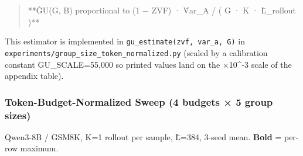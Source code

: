 \documentclass[
  american,
  11pt,
  a4paper,
  oneside]{report}
\begin{document}
\begin{quote}
**ĜU(G, B) proportional to (1 − ZVF) · V̂ar\_A / ( G · K · L̄\_rollout )**
\end{quote}

This estimator is implemented in \texttt{gu\_estimate(zvf,\ var\_a,\ G)}
in \texttt{experiments/group\_size\_token\_normalized.py} (scaled by a
calibration constant GU\_SCALE=55,000 so printed values land on the
×10\^{}-3 scale of the appendix table).

\subsubsection{Token-Budget-Normalized Sweep (4 budgets × 5 group
sizes)}\label{token-budget-normalized-sweep-4-budgets-5-group-sizes}

Qwen3-8B / GSM8K, K=1 rollout per sample, L̄=384, 3-seed mean.
\textbf{Bold} = per-row maximum.
\end{document}

